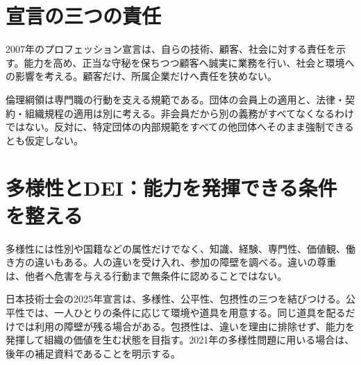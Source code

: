 \section{宣言の三つの責任}
\label{theory:profession:declaration}
2007年のプロフェッション宣言は、自らの技術、顧客、社会に対する責任を示す。能力を高め、正当な守秘を保ちつつ顧客へ誠実に業務を行い、社会と環境への影響を考える\parencite{eth54_profession2007}。顧客だけ、所属企業だけへ責任を狭めない。

倫理綱領は専門職の行動を支える規範である。団体の会員上の適用と、法律・契約・組織規程の適用は別に考える。非会員だから別の義務がすべてなくなるわけではない。反対に、特定団体の内部規範をすべての他団体へそのまま強制できるとも仮定しない。

\section{多様性とDEI：能力を発揮できる条件を整える}
\label{theory:ethics:diversity}
多様性には性別や国籍などの属性だけでなく、知識、経験、専門性、価値観、働き方の違いもある。人の違いを受け入れ、参加の障壁を調べる。違いの尊重は、他者へ危害を与える行動まで無条件に認めることではない。

日本技術士会の2025年宣言は、多様性、公平性、包摂性の三つを結びつける\parencite{eth54_dei2025}。公平性では、一人ひとりの条件に応じて環境や道具を用意する。同じ道具を配るだけでは利用の障壁が残る場合がある。包摂性は、違いを理由に排除せず、能力を発揮して組織の価値を生む状態を目指す。2021年の多様性問題に用いる場合は、後年の補足資料であることを明示する。
